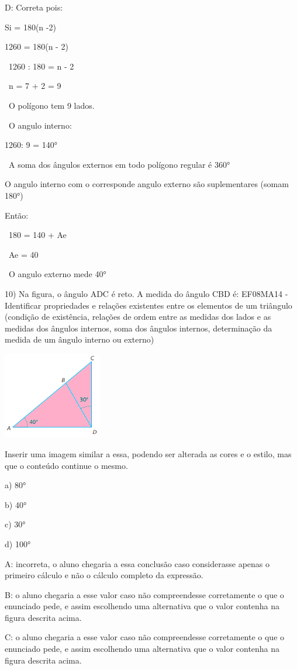 {D: Correta pois:

Si = 180(n -2)

1260 = 180(n - 2)

~1260 : 180 = n - 2

~n = 7 + 2 = 9

~O polígono tem 9 lados.

~O angulo interno:

1260: 9 = 140°

~A soma dos ângulos externos em todo polígono regular é 360°

O angulo interno com o corresponde angulo externo são suplementares
(somam 180°)

Então:

~180 = 140 + Ae

~Ae = 40

~O angulo externo mede 40°

10) Na figura, o ângulo ADC é reto. A medida do ângulo CBD é: EF08MA14 -
Identificar propriedades e relações existentes entre os elementos de um
triângulo (condição de existência, relações de ordem entre as medidas
dos lados e as medidas dos ângulos internos, soma dos ângulos internos,
determinação da medida de um ângulo interno ou externo)

\includegraphics[width=1.68333in,height=1.49462in]{./imgSAEB_8_MAT/media/image62.png}

Inserir uma imagem similar a essa, podendo ser alterada as cores e o
estilo, mas que o conteúdo continue o mesmo.

a) 80°

b) 40°

c) 30°

d) 100°

A: incorreta, o aluno chegaria a essa conclusão caso considerasse apenas
o primeiro cálculo e não o cálculo completo da expressão.

B: o aluno chegaria a esse valor caso não compreendesse corretamente o
que o enunciado pede, e assim escolhendo uma alternativa que o valor
contenha na figura descrita acima.

C: o aluno chegaria a esse valor caso não compreendesse corretamente o
que o enunciado pede, e assim escolhendo uma alternativa que o valor
contenha na figura descrita acima.

}
